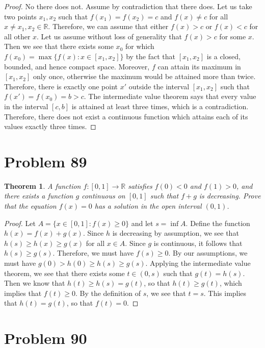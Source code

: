 \documentclass[psamsfonts]{amsart}
\newtheorem{thm}{Theorem}[section]
\theoremstyle{definition}
\theoremstyle{remark}
\numberwithin{equation}{section}
\begin{document}
\begin{proof}
No there does not. Assume by contradiction that there does. Let us take two points $x_1, x_2$ such that $f(x_1) = f(x_2) = c$ and $f(x) \neq c$ for all $x \neq x_1, x_2 \in \mathbb{R}$. Therefore, we can assume that either $f(x) > c$ or $f(x) < c$ for all other $x$. Let us assume without loss of generality that $f(x) > c$ for some $x$. Then we see that there exists some $x_0$ for which $f(x_0) = \max \{ f(x): x \in [x_1, x_2] \}$ by the fact that $[x_1, x_2]$ is a closed, bounded, and hence compact space. Moreover, $f$ can attain its maximum in $[x_1,x_2]$ only once, otherwise the maximum would be attained more than twice. Therefore, there is exactly one point $x'$ outside the interval $[x_1,x_2]$ such that $f(x') = f(x_0)= b >  c$. The intermediate value theorem says that every value in the interval $[c,b]$ is attained at least three times, which is a contradiction. Therefore, there does not exist a continuous function which attains each of its values exactly three times.
\end{proof}

\section{Problem 89}

\begin{thm}
A function $f: [0,1] \to \mathbb{R}$ satisfies $f(0) < 0$ and $f(1) > 0$, and there exists a function $g$ continuous on $[0,1]$ such that $f+g$ is decreasing. Prove that the equation $f(x) = 0$ has a solution in the open interval $(0,1)$. 
\end{thm}

\begin{proof}
Let $A = \{ x \in [0,1]: f(x) \geq 0 \}$ and let $s = \inf A$. Define the function $h(x) = f(x) + g(x)$. Since $h$ is decreasing by assumption, we see that $h(s) \geq h(x) \geq g(x)$ for all $x \in A$. Since $g$ is continuous, it follows that $h(s) \geq g(s)$. Therefore, we must have $f(s) \geq 0$. By our assumptions, we must have $g(0) > h(0) \geq h(s) \geq g(s)$. Applying the intermediate value theorem, we see that there exists some $t \in (0,s)$ such that $g(t) = h(s)$. Then we know that $h(t) \geq h(s) = g(t)$, so that $h(t) \geq g(t)$, which implies that $f(t) \geq 0$. By the definition of $s$, we see that $t = s$. This implies that $h(t) = g(t)$, so that $f(t) = 0$. 
\end{proof}

\section{Problem 90}
\end{document}
